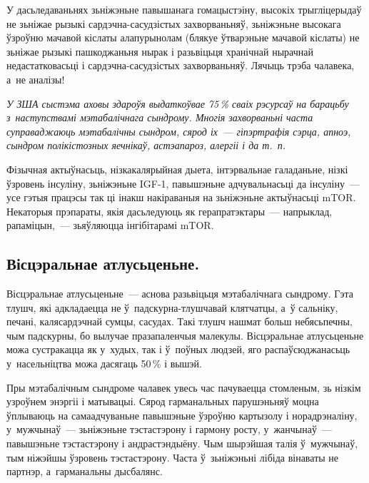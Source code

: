 У дасьледаваньнях зьніжэньне павышанага гомацыстэіну, высокіх трыгліцерыдаў не зьніжае рызыкі сардэчна-сасудзістых захворваньняў, зьніжэньне высокага ўзроўню мачавой кіслаты алапурынолам (блякуе ўтварэньне мачавой кіслаты) не зьніжае рызыкі пашкоджаньня нырак і разьвіцьця хранічнай нырачнай недастатковасьці і сардэчна-сасудзістых захворваньняў. Лячыць трэба чалавека, а~не аналізы!

\emph{У ЗША сыстэма аховы здароўя выдаткоўвае 75\,\% сваіх рэсурсаў на барацьбу з~наступствамі мэтабалічнага сындрому. Многія захворваньні часта суправаджаюць мэтабалічны сындром, сярод іх~--- гіпэртрафія сэрца, апноэ, сындром полікістозных яечнікаў, астэапароз, алергіі і да т.~п.}

Фізычная актыўнасьць, нізкакалярыйная дыета, інтэрвальнае галаданьне, нізкі ўзровень інсуліну, зьніжэньне IGF-1, павышэньне адчувальнасьці да інсуліну~--- усе гэтыя працэсы так ці інакш накіраваныя на зьніжэньне актыўнасьці mTOR. Некаторыя прэпараты, якія дасьледуюць як герапратэктары~--- напрыклад, рапаміцын,~--- зьяўляюцца інгібітарамі mTOR.

\subsection*{Вісцэральнае атлусьценьне.}

Вісцэральнае атлусьценьне~--- аснова разьвіцьця мэтабалічнага сындрому. Гэта тлушч, які адкладаецца не ў~падскурна-тлушчавай клятчатцы, а~ў сальніку, печані, калясардэчнай сумцы, сасудах. Такі тлушч нашмат больш небясьпечны, чым падскурны, бо вылучае празапаленчыя малекулы. Вісцэральнае атлусьценьне можа сустракацца як у~худых, так і ў~поўных людзей, яго распаўсюджанасьць у~насельніцтва можа дасягаць 50\,\% і вышэй.

Пры мэтабалічным сындроме чалавек увесь час пачуваецца стомленым, зь нізкім узроўнем энэргіі і матывацыі. Сярод гарманальных парушэньняў моцна ўплываюць на самаадчуваньне павышэньне ўзроўню картызолу і норадрэналіну, у~мужчынаў~--- зьніжэньне тэстастэрону і гармону росту, у~жанчынаў~--- павышэньне тэстастэрону і андрастэндыёну. Чым шырэйшая талія ў~мужчынаў, тым ніжэйшы ўзровень тэстастэрону. Часта ў~зьніжэньні лібіда вінаваты не партнэр, а~гарманальны дысбалянс.


